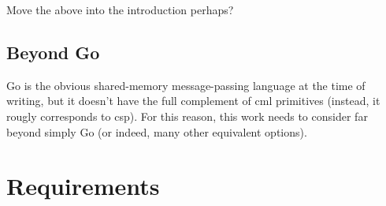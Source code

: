 Move the above into the introduction perhaps?

\subsection{Beyond Go}
Go is the obvious shared-memory message-passing language at the time of writing, but it doesn't have the full complement of \gls{cml} primitives (instead, it rougly corresponds to \gls{csp}).  For this reason, this work needs to consider far beyond simply Go (or indeed, many other equivalent options).

\section{Requirements}
